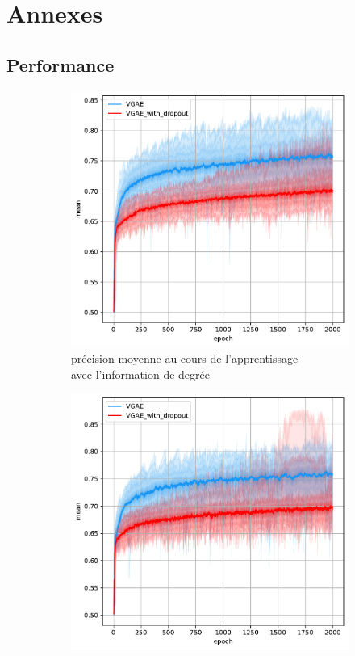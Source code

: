 \documentclass{article}
\begin{document}
\section{Annexes}

\subsection{Performance}
\begin{figure}[H]
    \centering
    \captionsetup{justification=centering}
    \begin{subfigure}{0.45\textwidth}
      \includegraphics[width=\textwidth]{graphics/APs_degree_dropout_cinf.svg.pdf}
      \centering
      \caption{précision moyenne au cours de l'apprentissage\\ avec l'information de degrée}
    \end{subfigure}
    \begin{subfigure}{0.45\textwidth}
      \includegraphics[width=\textwidth]{graphics/APs_no_degree_dropout_cinf.svg.pdf}

\end{subfigure}
\end{figure}
\end{document}
